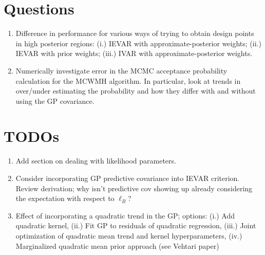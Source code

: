 \documentclass[12pt]{article}
\begin{document}
\section{Questions}
\begin{enumerate} 
\item Difference in performance for various ways of trying to obtain design points in high posterior regions: (i.) IEVAR with approximate-posterior 
weights; (ii.) IEVAR with prior weights; (iii.) IVAR with approximate-posterior weights. 
\item Numerically investigate error in the MCMC acceptance probability calculation for the MCWMH algorithm. In particular, look at trends in over/under 
estimating the probability and how they differ with and without using the GP covariance. 
\end{enumerate}


\section{TODOs}
\begin{enumerate}
\item Add section on dealing with likelihood parameters. 
\item Consider incorporating GP predictive covariance into IEVAR criterion. Review derivation; why isn't predictive cov showing up already considering the 
expectation with respect to $\ell_B$? 
\item Effect of incorporating a quadratic trend in the GP; options: (i.) Add quadratic kernel, (ii.) Fit GP to residuals of quadratic regression, (iii.) Joint optimization 
of quadratic mean trend and kernel hyperparameters, (iv.) Marginalized quadratic mean prior approach (see Vehtari paper) 
\end{enumerate}

 

\end{document}
